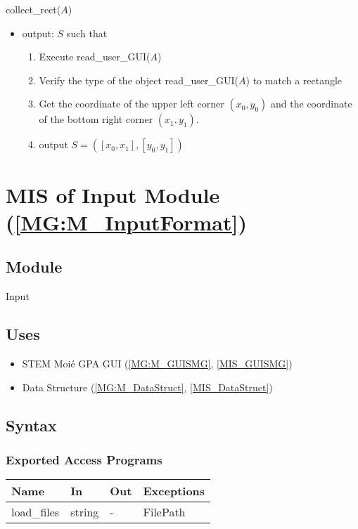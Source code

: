 \documentclass[12pt, titlepage]{article}
\begin{document}
\noindent collect{\_}rect($A$)
\begin{itemize}
\item output: $S$ such that
	\begin{enumerate}
	\item Execute read{\_}user{\_}GUI($A$)
	\item Verify the type of the object read{\_}user{\_}GUI($A$) to match a rectangle
	\item Get the coordinate of the upper left corner $(x_0,y_0)$ and the coordinate of the bottom right corner $(x_1,y_1)$. 
	\item output $S=([x_0,x_1],[y_0,y_1])$
	\end{enumerate} 
\end{itemize}
\bigskip

\section{MIS of Input Module (\texorpdfstring{\cref{MG:M_InputFormat}}))} \label{MIS_Input}

\subsection{Module}
Input
\subsection{Uses}
\begin{itemize}
\item STEM Moi{\'e} GPA GUI (\cref{MG:M_GUISMG}, \cref{MIS_GUISMG})
\item Data Structure (\cref{MG:M_DataStruct}, \cref{MIS_DataStruct})
\end{itemize}

\subsection{Syntax}

\subsubsection{Exported Access Programs}

\begin{center}
\begin{tabular}{p{4cm} p{4cm} p{4cm} p{2cm}}
\hline
\textbf{Name} & \textbf{In} & \textbf{Out} & \textbf{Exceptions} \\
\hline
load{\_}files & string & - & FilePath \\
\hline
\end{tabular}
\end{center}
\end{document}
